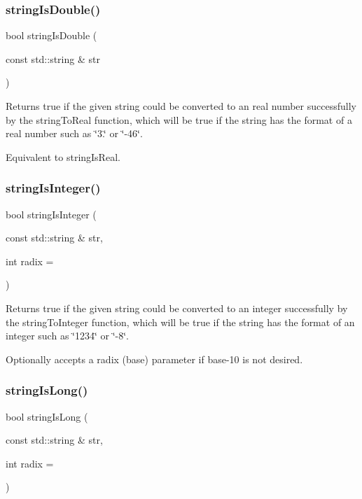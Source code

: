 \subsubsection{\texorpdfstring{string\+Is\+Double()}{stringIsDouble()}}
{\footnotesize\ttfamily bool string\+Is\+Double (\begin{DoxyParamCaption}\item[{const std\+::string \&}]{str }\end{DoxyParamCaption})}



Returns true if the given string could be converted to an real number successfully by the string\+To\+Real function, which will be true if the string has the format of a real number such as \char`\"{}3.\char`\"{} or \char`\"{}-\/46\char`\"{}. 

Equivalent to string\+Is\+Real. \mbox{\label{namespacesgl_1_1priv_1_1strlib_a5a1194f3117e549291895bdbbe76f85f}} 
\subsubsection{\texorpdfstring{string\+Is\+Integer()}{stringIsInteger()}}
{\footnotesize\ttfamily bool string\+Is\+Integer (\begin{DoxyParamCaption}\item[{const std\+::string \&}]{str,  }\item[{int}]{radix = {} }\end{DoxyParamCaption})}



Returns true if the given string could be converted to an integer successfully by the string\+To\+Integer function, which will be true if the string has the format of an integer such as \char`\"{}1234\char`\"{} or \char`\"{}-\/8\char`\"{}. 

Optionally accepts a radix (base) parameter if base-\/10 is not desired. \mbox{\label{namespacesgl_1_1priv_1_1strlib_ac7499f39dad1514e946909d251d07ffd}} 
\subsubsection{\texorpdfstring{string\+Is\+Long()}{stringIsLong()}}
{\footnotesize\ttfamily bool string\+Is\+Long (\begin{DoxyParamCaption}\item[{const std\+::string \&}]{str,  }\item[{int}]{radix = {} }\end{DoxyParamCaption})}



